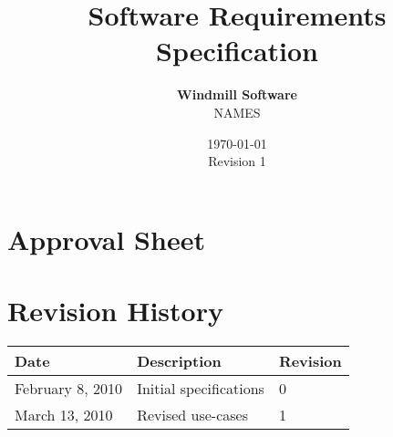 \documentclass[letterpaper,titlepage]{article}
\begin{document}

\title{\textbf{Software Requirements Specification}}
\author{\textbf{Windmill Software }\\
NAMES
	}
\date{\today\\Revision 1}
\maketitle
\pagebreak

\section*{Approval Sheet}
\thispagestyle{plain}

\vspace{4cm}

\pagebreak

\thispagestyle{plain}
\section*{Revision History}
    \bigskip
    \begin{center}
	    \begin{tabular*}{.8\textwidth}{@{\extracolsep{\fill}} lll }
        \bf Date            & \bf Description               & \bf Revision\\
        \hline \hline
        February 8, 2010 & Initial specifications & 0 \\
        \hline
        March 13, 2010 & Revised use-cases & 1 \\
        \hline
    \end{tabular*}
    \end{center}
\pagebreak

\thispagestyle{plain}
\setcounter{tocdepth}{3}
\tableofcontents
\pagebreak







	
\end{document}
